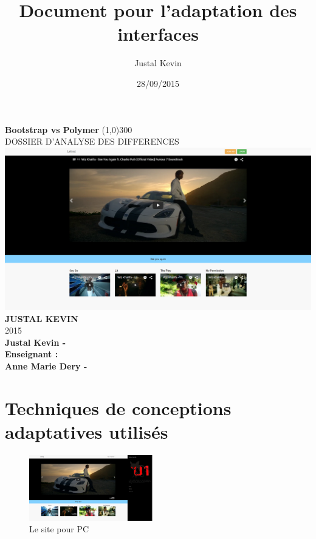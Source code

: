 \documentclass{article}
\title{Document pour l'adaptation des interfaces}
\author{Justal Kevin}
\date{28/09/2015}
\begin{document}
\begin{center}
\textbf{\Huge{Bootstrap vs Polymer}}
\line(1,0){300}\\
DOSSIER D'ANALYSE DES DIFFERENCES\\
\vspace{3cm}
\includegraphics[width=1.0\textwidth]{pc}\\
\vspace{3cm}
\textbf{\Large{JUSTAL KEVIN}}\\
2015\\
\vspace{2cm}
\textbf{Justal Kevin -  \color{black}{- SI5 - IHM}}\\
\vspace{4cm}
\textbf{Enseignant :}\\
\textbf{Anne Marie Dery - }
\end{center}

\newpage
\newpage
\tableofcontents

\newpage

\section{Techniques de conceptions adaptatives utilis\'es}

\begin{figure}
  \vspace{-20pt}
  \begin{center}
    \includegraphics[width=0.48\textwidth]{p2}
  \end{center}
  \vspace{-20pt}
  \caption{Le site pour PC}
  \vspace{-10pt}
\end{figure}
\end{document}
